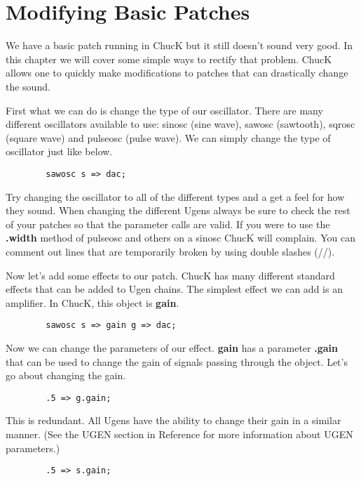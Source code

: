 \section{Modifying Basic Patches}

We have a basic patch running in ChucK but it still doesn't sound very good. In this chapter we will cover some simple ways to rectify that problem. ChucK allows one to quickly make modifications to patches that can drastically change the sound.

First what we can do is change the type of our oscillator. There are many different oscillators available to use: sinosc (sine wave), sawosc (sawtooth), sqrosc (square wave) and  pulseosc (pulse wave). We can simply change the type of oscillator just like below. 

\begin{verbatim}
        sawosc s => dac;
\end{verbatim}

Try changing the oscillator to all of the different types and a get a feel for how they sound. When changing the different Ugens always be sure to check the rest of your patches so that the parameter calls are valid. If you were to use the {\bf .width} method of pulseosc and others on a sinosc ChucK will complain. You can comment out lines that are temporarily broken by using double slashes (//).

Now let's add some effects to our patch. ChucK has many different standard effects that can be added to Ugen chains. The simplest effect we can add is an amplifier. In ChucK, this object is {\bf gain}.

\begin{verbatim}
        sawosc s => gain g => dac;
\end{verbatim}

Now we can change the parameters of our effect. {\bf gain} has a parameter {\bf .gain} that can be used to change the gain  of signals passing through the object. Let's go about changing the gain.

\begin{verbatim}
        .5 => g.gain;
\end{verbatim}

This is redundant. All Ugens have the ability to change their gain in a similar manner. (See the UGEN section in Reference for more information about UGEN parameters.)

\begin{verbatim}
        .5 => s.gain;
\end{verbatim}

